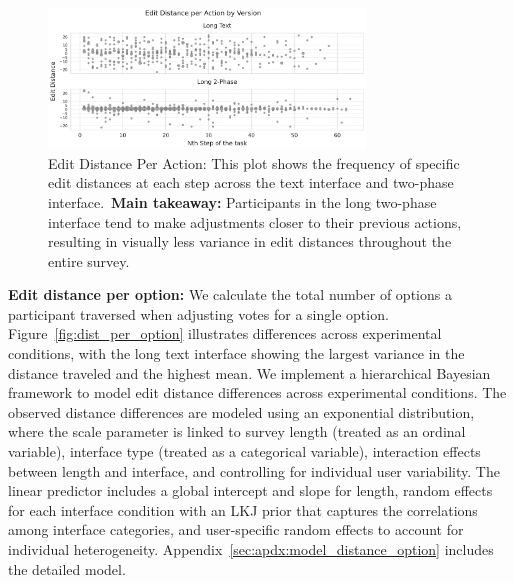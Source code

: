 \begin{figure}[h!]
    \centering
    \includegraphics[width=0.75\textwidth]{content/image/distance/edit_distance_per_action_by_version.pdf}
    \caption{Edit Distance Per Action: This plot shows the frequency of specific edit distances at each step across the text interface and two-phase interface.~\textbf{Main takeaway:} Participants in the long two-phase interface tend to make adjustments closer to their previous actions, resulting in visually less variance in edit distances throughout the entire survey.}
    \label{fig:step-over-distance}
\end{figure}

\textbf{Edit distance per option:} We calculate the total number of options a participant traversed when adjusting votes for a single option. Figure~\ref{fig:dist_per_option} illustrates differences across experimental conditions, with the long text interface showing the largest variance in the distance traveled and the highest mean. We implement a hierarchical Bayesian framework to model edit distance differences across experimental conditions. The observed distance differences are modeled using an exponential distribution, where the scale parameter is linked to survey length (treated as an ordinal variable), interface type (treated as a categorical variable), interaction effects between length and interface, and controlling for individual user variability. The linear predictor includes a global intercept and slope for length, random effects for each interface condition with an LKJ prior that captures the correlations among interface categories, and user-specific random effects to account for individual heterogeneity. Appendix~\ref{sec:apdx:model_distance_option} includes the detailed model.

